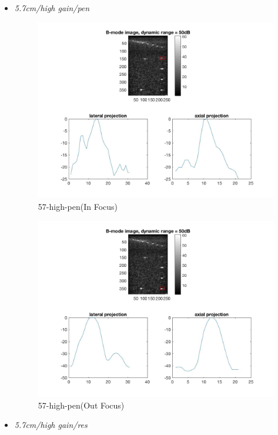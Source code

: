 \documentclass{article}
\begin{document}
\pagebreak
\begin{itemize}
\item{\emph{5.7cm/high gain/pen}}
\begin{center}
\end{center}
\begin{figure}[h]
    \centering
    \includegraphics[width=1.0\textwidth]{img_hw1/57-high-pen1.jpg}
    \caption{57-high-pen(In Focus)}
    \label{fig:mesh1}
\end{figure}
\pagebreak
\begin{figure}[h]
    \centering
    \includegraphics[width=1.0\textwidth]{img_hw1/57-high-pen2.jpg}
    \caption{57-high-pen(Out Focus)}
    \label{fig:mesh1}
\end{figure}
\item{\emph{5.7cm/high gain/res}}
\begin{center}
\end{center}
\end{itemize}
\end{document}
